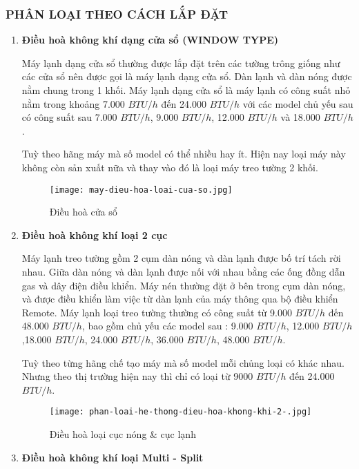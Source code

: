 	\subsubsection{PHÂN LOẠI THEO CÁCH LẮP ĐẶT}
	\begin{enumerate}
		\item \textbf{Điều hoà không khí dạng cửa sổ (WINDOW TYPE)} 
		
		Máy lạnh dạng cửa sổ thường được lắp đặt trên các tường trông giống như các cửa sổ nên được gọi là máy lạnh dạng cửa sổ. Dàn lạnh và dàn nóng được nằm chung trong 1 khối. Máy lạnh dạng cửa sổ là máy lạnh có công suất nhỏ nằm trong khoảng 7.000 $ BTU/h $ đến 24.000 $ BTU/h $ với các model chủ yếu sau có công suất sau 7.000 $ BTU/h $, 9.000 $ BTU/h $, 12.000 $ BTU/h $ và 18.000 $ BTU/h $. 
		
		Tuỳ theo hãng máy mà số model có thể nhiều hay ít. Hiện nay loại máy này không còn sản xuất nữa và thay vào đó là loại máy treo tường 2 khối.
		
\begin{figure}[H]
	\centering
	\texttt{[image: may-dieu-hoa-loai-cua-so.jpg]}
	\caption{Điều hoà cửa sổ}
\end{figure}
		
		\item \textbf{Điều hoà không khí loại 2 cục}
		
		Máy lạnh treo tường gồm 2 cụm dàn nóng và dàn lạnh được bố trí tách rời nhau. Giữa dàn nóng và dàn lạnh được nối với nhau bằng các ống đồng dẫn gas và dây điện điều khiển. Máy nén thường đặt ở bên trong cụm dàn nóng, và được điều khiển làm việc từ dàn lạnh của máy thông qua bộ điều khiển Remote. Máy lạnh loại treo tường thường có công suất từ 9.000 $ BTU/h $ đến 48.000 $ BTU/h $, bao gồm chủ yếu các model sau : 9.000 $ BTU/h $, 12.000 $ BTU/h $,18.000 $ BTU/h $, 24.000 $ BTU/h $, 36.000 $ BTU/h $, 48.000 $ BTU/h $. 
		
		Tuỳ theo từng hãng chế tạo máy mà số model mỗi chủng loại có khác nhau. Nhưng theo thị trường hiện nay thì chỉ có loại từ 9000 $ BTU/h $ đến 24.000 $ BTU/h $.
		
\begin{figure}[H]
	\centering
	\texttt{[image: phan-loai-he-thong-dieu-hoa-khong-khi-2-.jpg]}
	\caption{Điều hoà loại cục nóng \& cục lạnh}
\end{figure}
		
		\item \textbf{Điều hoà không khí loại Multi - Split}
		

\end{enumerate}
